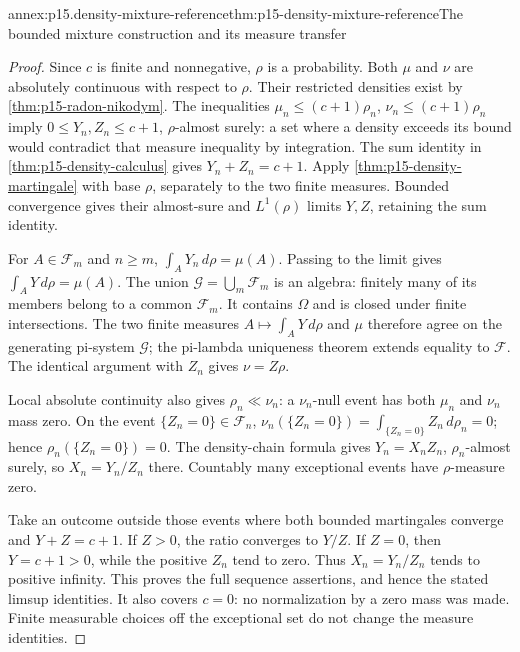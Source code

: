 \begin{annexitem}{annex:p15.density-mixture-reference}{thm:p15-density-mixture-reference}{The bounded mixture construction and its measure transfer}
\begin{proof}
Since \(c\) is finite and nonnegative, \(\rho\) is a probability.
Both \(\mu\) and \(\nu\) are absolutely continuous with respect to
\(\rho\). Their restricted densities exist by
\cref{thm:p15-radon-nikodym}. The inequalities
\(\mu_n\leq(c+1)\rho_n\), \(\nu_n\leq(c+1)\rho_n\) imply
\(0\leq Y_n,Z_n\leq c+1\), \(\rho\)-almost surely:
a set where a density exceeds its bound would contradict that measure
inequality by integration. The sum identity in
\cref{thm:p15-density-calculus} gives \(Y_n+Z_n=c+1\).
Apply \cref{thm:p15-density-martingale} with base \(\rho\), separately
to the two finite measures. Bounded convergence gives their
almost-sure and \(L^1(\rho)\) limits \(Y,Z\), retaining the sum identity.

For \(A\in\mathcal F_m\) and \(n\geq m\),
\(\int_A Y_n\,d\rho=\mu(A)\). Passing to the limit gives
\(\int_A Y\,d\rho=\mu(A)\). The union
\(\mathcal G=\bigcup_m\mathcal F_m\) is an algebra: finitely many of
its members belong to a common \(\mathcal F_m\).
It contains \(\Omega\) and is closed under finite intersections.
The two finite measures \(A\mapsto\int_A Y\,d\rho\) and \(\mu\)
therefore agree on the generating pi-system \(\mathcal G\);
the pi-lambda uniqueness theorem extends equality to \(\mathcal F\).
The identical argument with \(Z_n\) gives \(\nu=Z\rho\).

Local absolute continuity also gives \(\rho_n\ll\nu_n\):
a \(\nu_n\)-null event has both \(\mu_n\) and \(\nu_n\) mass zero.
On the event \(\{Z_n=0\}\in\mathcal F_n\),
\(\nu_n(\{Z_n=0\})=\int_{\{Z_n=0\}}Z_n\,d\rho_n=0\);
hence \(\rho_n(\{Z_n=0\})=0\).
The density-chain formula gives
\(Y_n=X_nZ_n\), \(\rho_n\)-almost surely, so \(X_n=Y_n/Z_n\)
there. Countably many exceptional events have \(\rho\)-measure zero.

Take an outcome outside those events where both bounded martingales
converge and \(Y+Z=c+1\).
If \(Z>0\), the ratio converges to \(Y/Z\).
If \(Z=0\), then \(Y=c+1>0\), while the positive \(Z_n\) tend to
zero. Thus \(X_n=Y_n/Z_n\) tends to positive infinity.
This proves the full sequence assertions, and hence the stated limsup
identities. It also covers \(c=0\): no normalization by a zero mass
was made. Finite measurable choices off the exceptional set do not
change the measure identities.
\end{proof}
\end{annexitem}

